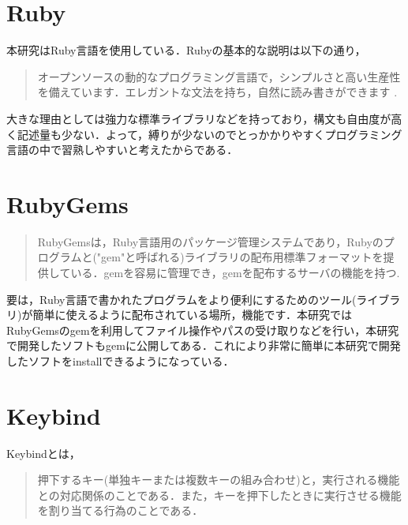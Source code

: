     \section{Ruby}\label{ruby}

本研究はRuby言語を使用している．Rubyの基本的な説明は以下の通り，
\begin{quotation}
オープンソースの動的なプログラミング言語で，シンプルさと高い生産性を備えています．エレガントな文法を持ち，自然に読み書きができます\cite{ruby} . 
\end{quotation}
大きな理由としては強力な標準ライブラリなどを持っており，構文も自由度が高く記述量も少ない．よって，縛りが少ないのでとっかかりやすくプログラミング言語の中で習熟しやすいと考えたからである．

    \section{RubyGems}\label{rubygems}

\begin{quotation}
RubyGemsは，Ruby言語用のパッケージ管理システムであり，Rubyのプログラムと("gem"と呼ばれる)ライブラリの配布用標準フォーマットを提供している．gemを容易に管理でき，gemを配布するサーバの機能を持つ.  \cite{gems} 
\end{quotation}


要は，Ruby言語で書かれたプログラムをより便利にするためのツール(ライブラリ)が簡単に使えるように配布されている場所，機能です．本研究ではRubyGemsのgemを利用してファイル操作やパスの受け取りなどを行い，本研究で開発したソフトもgemに公開してある．これにより非常に簡単に本研究で開発したソフトをinstallできるようになっている．

    \section{Keybind}\label{keybind}

Keybindとは，
\begin{quotation}
押下するキー(単独キーまたは複数キーの組み合わせ)と，実行される機能との対応関係のことである．また，キーを押下したときに実行させる機能を割り当てる行為のことである． \cite{keybind}
\end{quotation}

